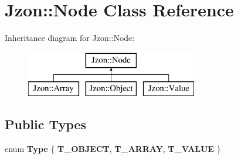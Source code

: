 \hypertarget{class_jzon_1_1_node}{\section{Jzon\-:\-:Node Class Reference}
\label{class_jzon_1_1_node}
}
Inheritance diagram for Jzon\-:\-:Node\-:\begin{figure}[H]
\begin{center}
\leavevmode
\includegraphics[height=2.000000cm]{class_jzon_1_1_node}
\end{center}
\end{figure}
\subsection*{Public Types}
\begin{DoxyCompactItemize}
\item 
enum {\bfseries Type} \{ {\bfseries T\-\_\-\-O\-B\-J\-E\-C\-T}, 
{\bfseries T\-\_\-\-A\-R\-R\-A\-Y}, 
{\bfseries T\-\_\-\-V\-A\-L\-U\-E}
 \}
\end{DoxyCompactItemize}

